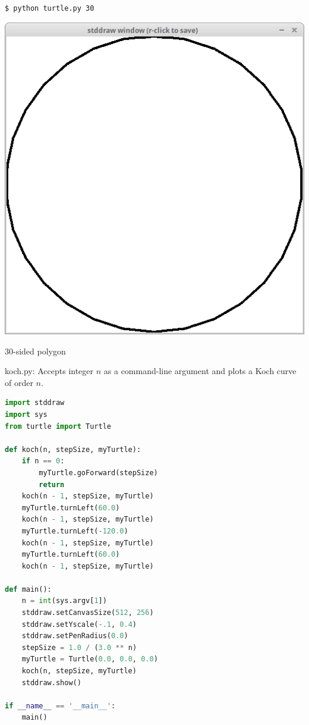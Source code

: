 \documentclass[8pt,a4paper,compress,handout]{beamer}
\begin{document}
\begin{frame}[fragile]
\begin{minipage}{200pt}
\begin{lstlisting}[language={}]
$ python turtle.py 30
\end{lstlisting}
\end{minipage}%
\hfill
\begin{minipage}{100pt}
\begin{center}
\includegraphics[scale=0.12]{figures/turtle3.png}

\smallskip

\tiny 30-sided polygon
\end{center}
\end{minipage}%
\end{frame}

\begin{frame}[fragile]
\begin{framed}
\tiny koch.py: Accepts integer $n$ as a command-line argument and plots a Koch curve of order $n$.
\end{framed}

\begin{lstlisting}[language=Python]
import stddraw
import sys
from turtle import Turtle

def koch(n, stepSize, myTurtle):
    if n == 0:
        myTurtle.goForward(stepSize)
        return  
    koch(n - 1, stepSize, myTurtle)
    myTurtle.turnLeft(60.0)
    koch(n - 1, stepSize, myTurtle)
    myTurtle.turnLeft(-120.0)
    koch(n - 1, stepSize, myTurtle)
    myTurtle.turnLeft(60.0)
    koch(n - 1, stepSize, myTurtle)
 
def main():
    n = int(sys.argv[1])
    stddraw.setCanvasSize(512, 256)
    stddraw.setYscale(-.1, 0.4)
    stddraw.setPenRadius(0.0)
    stepSize = 1.0 / (3.0 ** n)
    myTurtle = Turtle(0.0, 0.0, 0.0)
    koch(n, stepSize, myTurtle)
    stddraw.show()

if __name__ == '__main__':
    main()
\end{lstlisting}
\end{frame}
\end{document}

